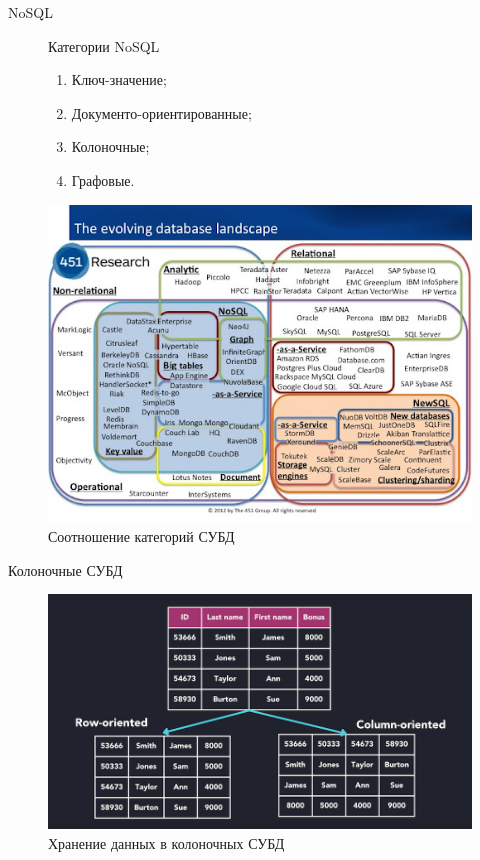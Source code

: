 \documentclass{beamer}
\begin{document}
\begin{frame}{NoSQL}

	\begin{figure}
		\begin{minipage}{0.36\textwidth}
			\begin{alertblock}{Категории NoSQL}
				\begin{enumerate}
					\item Ключ-значение;
					\item Документо-ориентированные;
					\item Колоночные;
					\item Графовые.
				\end{enumerate}
			\end{alertblock}
		\end{minipage}
		\hfill
		\begin{minipage}{0.62\textwidth}
			\centering
			\includegraphics[width=\linewidth]{./imgs/dblandscape.jpg}
			\caption{Соотношение категорий СУБД}
		\end{minipage}
	\end{figure}

\end{frame}

\begin{frame}{Колоночные СУБД}
	\begin{figure}[H]
		\centering
		\includegraphics[width=.8\linewidth]{./imgs/columnar-database.png}
		\caption{Хранение данных в колоночных СУБД}
	\end{figure}
\end{frame}
\end{document}

